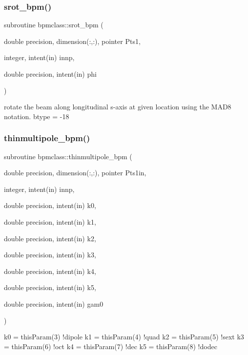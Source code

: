 \subsubsection{\texorpdfstring{srot\_bpm()}{srot\_bpm()}}
{\footnotesize\ttfamily subroutine bpmclass\+::srot\+\_\+bpm (\begin{DoxyParamCaption}\item[{double precision, dimension(\+:,\+:), pointer}]{Pts1,  }\item[{integer, intent(in)}]{innp,  }\item[{double precision, intent(in)}]{phi }\end{DoxyParamCaption})}



rotate the beam along longitudinal s-\/axis at given location using the M\+A\+D8 notation. btype = -\/18 

\mbox{\label{namespacebpmclass_a53e45bf561ab6326ac3af0941f0a9ab4}} 
\subsubsection{\texorpdfstring{thinmultipole\_bpm()}{thinmultipole\_bpm()}}
{\footnotesize\ttfamily subroutine bpmclass\+::thinmultipole\+\_\+bpm (\begin{DoxyParamCaption}\item[{double precision, dimension(\+:,\+:), pointer}]{Pts1in,  }\item[{integer, intent(in)}]{innp,  }\item[{double precision, intent(in)}]{k0,  }\item[{double precision, intent(in)}]{k1,  }\item[{double precision, intent(in)}]{k2,  }\item[{double precision, intent(in)}]{k3,  }\item[{double precision, intent(in)}]{k4,  }\item[{double precision, intent(in)}]{k5,  }\item[{double precision, intent(in)}]{gam0 }\end{DoxyParamCaption})}



k0 = thisParam(3) !dipole k1 = thisParam(4) !quad k2 = thisParam(5) !sext k3 = thisParam(6) !oct k4 = thisParam(7) !dec k5 = thisParam(8) !dodec 



